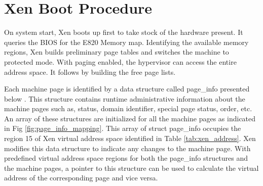 \section{Xen Boot Procedure}
On system start, Xen boots up first to take stock of the hardware present. It queries the BIOS for the E820 Memory map. Identifying the available memory regions, Xen builds preliminary page tables and switches the machine to protected mode. With paging enabled, the hypervisor can access the entire address space. It follows by building the free page lists.

Each machine page is identified by a data structure called page\_info presented below \cite{xen_code}. This structure contains runtime administrative information about the machine pages such as, status, domain identifier, special page status, order, etc. An array of these structures are initialized for all the machine pages as indicated in Fig \ref{fig:page_info_mapping}. This array of struct page\_info occupies the region 15 of Xen virtual address space identified in Table \ref{tab:xen_address}. Xen modifies this data structure to indicate any changes to the machine page. With predefined virtual address space regions for both the page\_info structures and the machine pages, a pointer to this structure can be used to calculate the virtual address of the corresponding page and vice versa. 

